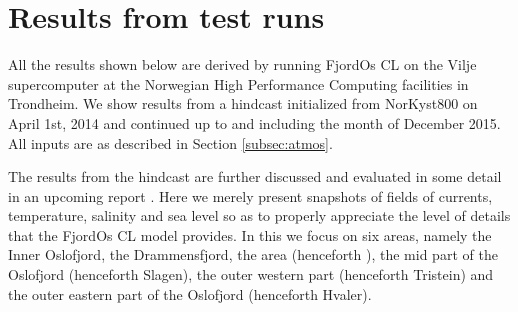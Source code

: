 \section{Results from test runs}
\label{sec:resul}
All the results shown below are derived by running FjordOs CL on the Vilje supercomputer at the Norwegian High Performance Computing facilities in Trondheim. We show results from a hindcast initialized from NorKyst800 on April 1st, 2014 and continued up to and including the month of December 2015. 
All inputs are as described in Section \ref{subsec:atmos}.
 
The results from the hindcast are further discussed and evaluated in some detail in an upcoming report \citep{hjelm:etal:2016}. Here we merely present snapshots of fields of currents, temperature, salinity and sea level so as to properly appreciate the level of details that the FjordOs CL model provides. In this we focus on six areas, namely the Inner Oslofjord, the Drammensfjord, the {\DR} area (henceforth {\DR}), the mid part of the Oslofjord (henceforth Slagen), the outer western part (henceforth Tristein) and the outer eastern part of the Oslofjord (henceforth Hvaler). 

\clearpage
   
   
   
   
   
   

   

   

   
\clearpage
